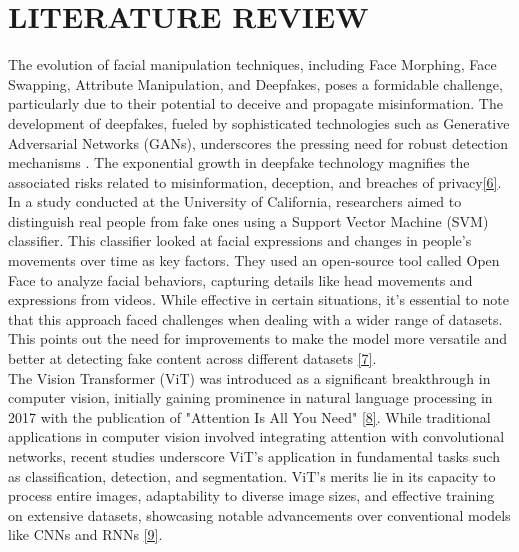\section{LITERATURE REVIEW}

The evolution of facial manipulation techniques, including Face Morphing, Face Swapping, Attribute Manipulation, and Deepfakes, poses a formidable challenge, particularly due to their potential to deceive and propagate misinformation. The development of deepfakes, fueled by sophisticated technologies such as Generative Adversarial Networks (GANs), underscores the pressing need for robust detection mechanisms . The exponential growth in deepfake technology magnifies the associated risks related to misinformation, deception, and breaches of privacy\hyperref[ref6]{[6]}.\\

\noindent In a study conducted at the University of California, researchers aimed to distinguish real people from fake ones using a Support Vector Machine (SVM) classifier. This classifier looked at facial expressions and changes in people's movements over time as key factors. They used an open-source tool called Open Face to analyze facial behaviors, capturing details like head movements and expressions from videos. While effective in certain situations, it's essential to note that this approach faced challenges when dealing with a wider range of datasets. This points out the need for improvements to make the model more versatile and better at detecting fake content across different datasets \hyperref[ref7]{[7]}.\\

\noindent The Vision Transformer (ViT) was introduced as a significant breakthrough in computer vision, initially gaining prominence in natural language processing in 2017 with the publication of "Attention Is All You Need" \hyperref[ref8]{[8]}. While traditional applications in computer vision involved integrating attention with convolutional networks, recent studies underscore ViT's application in fundamental tasks such as classification, detection, and segmentation. ViT's merits lie in its capacity to process entire images, adaptability to diverse image sizes, and effective training on extensive datasets, showcasing notable advancements over conventional models like CNNs and RNNs \hyperref[ref9]{[9]}.\\

